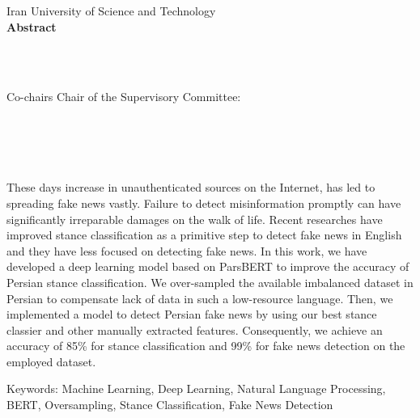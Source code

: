 
\thispagestyle{empty}
\begin{centering}
\vspace{1in}
Iran University of Science and Technology \\
\vspace*{1.\baselineskip}
{\bf Abstract}\\
\vspace*{1\baselineskip}

{\thesisTitle}\\ %
\vspace*{1.\baselineskip}
{\authorName} \\ %
\vspace*{1.\baselineskip}


\ifdefined\secondAdvisor
    Co-chairs
    \else
    Chair
\fi
of the Supervisory Committee:\\ %
\advisorTitle~\advisor\\ \vspace{-.5em} \advisorDepartment \\
\ifdefined\secondAdvisor
    \secondAdvisorTitle~\secondAdvisor\\\vspace{-.5em}\secondAdvisorDepartment \\
\fi
\end{centering}
\vspace*{\baselineskip}
These days increase in unauthenticated sources on the Internet, has led to spreading fake news vastly. 
Failure to detect misinformation promptly can have significantly irreparable damages on the walk of life.
Recent researches have improved stance classification as a primitive step to detect fake news in English and they have less focused on detecting fake news.
In this work, we have developed a deep learning model based on ParsBERT to improve the accuracy of Persian stance classification. 
We over-sampled the available imbalanced dataset in Persian to compensate lack of data in such a low-resource language.
Then, we implemented a model to detect Persian fake news by using our best stance classier and other manually extracted features. 
Consequently, we achieve an accuracy of 85\% for stance classification and 99\% for fake news detection on the employed dataset.

\bigbreak
\vspace*{3cm}
\bigbreak
Keywords: Machine Learning, Deep Learning, Natural Language Processing, BERT, Oversampling, Stance Classification, Fake News Detection